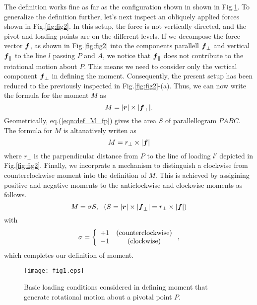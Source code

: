 \documentclass[10pt,a4j]{article}
\begin{document}
The definition works fine as far as the configuration shown in shown in Fig.\ref{fig:fig1}.
To generalize the definition further, let's next inspect an obliquely applied forces
 shown in Fig.\ref{fig:fig2}.
In this setup, the force is not vertically directed, and the pivot and loading points are on the different levels.
If we decompose the force vector $\mbox{\boldmath $f$}$, as shown in Fig.\ref{fig:fig2} into the components parallell $\mbox{\boldmath $f$}_{\perp}$ 
and vertical $\mbox{\boldmath $f$}_\parallel$ to the line $l$ passing $P$ and $A$, we notice that $\mbox{\boldmath $f$}_{\parallel}$ does not 
contribute to the rotational motion about $P$. 
This means we need to consider only the vertical component $\mbox{\boldmath $f$}_{\perp}$ in defining the moment. 
Consequently, the present setup has been reduced to the previously inspected in Fig.\ref{fig:fig2}-(a).
Thus, we can now write the formula for the moment $M$ as 
\begin{equation}
	M=|\mbox{\boldmath $r$}|\times |\mbox{\boldmath $f$}_{\perp}|.
	\label{eqn:def_M_fp}
\end{equation}
Geometrically, eq.(\ref{eqn:def_M_fp}) gives the area $S$ of parallellogram $PABC$. 
The formula for $M$ is altanatively writen as
\begin{equation}
	M=r_\perp \times |\mbox{\boldmath $f$}|
	\label{eqn:}
\end{equation}
where $r_\perp$ is the parpendicular distance from $P$ to the line of loading 
$l'$ depicted in Fig.\ref{fig:fig2}.
Finally, we incorprate a mechanism to distinguish a clockwise from counterclockwise 
moment into the definition of $M$. This is achieved by assigining positive 
and negative moments to the anticlockwise and clockwise moments as follows.
\begin{equation}
	M=\sigma S , \ \ \left(S= |\mbox{\boldmath $r$}|\times |\mbox{\boldmath $f$}_{\perp}|=r_\perp \times |\mbox{\boldmath $f$}| \right)
	\label{eqn:M_def}
\end{equation}
with 
\begin{equation}
	\sigma=\left\{
		\begin{array}{cc}
			+1 & ({\rm counterclockwise}) \\
			-1 & ({\rm clockwise}) 
		\end{array}
	\right.
	,
	\label{eqn:sign}
\end{equation}
which completes our definition of moment. 
\begin{figure}[h]
	\begin{center}
	\texttt{[image: fig1.eps]} 
	\end{center}
	\caption{
		Basic loading conditions considered in defining moment that generate 
		rotational motion about a pivotal point $P$.} 
	\label{fig:fig1}
\end{figure}
\end{document}
